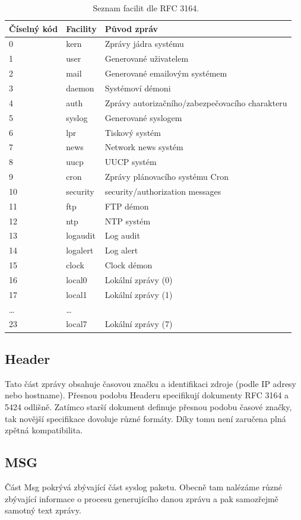 \documentclass[thesis=B,czech]{FITthesis}[2012/06/26]
\begin{document}
\begin{table}[ht]   %
\centering
	\caption[Tabulka facilit podle RFC 3164]{Seznam facilit dle RFC 3164.~\cite{RFC3164}}
	\begin{tabular}{|l|l|l|}\hline
		Číselný kód & Facility & Původ zpráv \tabularnewline \hline \hline
		0		& kern & Zprávy jádra systému	\tabularnewline \hline
		1		& user & Generované uživatelem	\tabularnewline \hline
		2		& mail & Generované emailovým systémem			\tabularnewline \hline
		3		& daemon & Systémoví démoni			\tabularnewline \hline
		4		& auth & Zprávy autorizačního/zabezpečovacího charakteru		\tabularnewline \hline
		5		& syslog & Generované syslogem	\tabularnewline \hline
		6		& lpr & Tiskový systém		\tabularnewline \hline
		7		& news & Network news systém		\tabularnewline \hline
		8		& uucp & UUCP systém			\tabularnewline \hline
		9		& cron & Zprávy plánovacího systému Cron			\tabularnewline \hline
		10		& security & security/authorization messages			\tabularnewline \hline
		11		& ftp & FTP démon				\tabularnewline \hline
		12		& ntp & NTP systém			\tabularnewline \hline
		13		& logaudit & Log audit				\tabularnewline \hline
		14		& logalert & Log alert				\tabularnewline \hline
		15		& clock & Clock démon			\tabularnewline \hline
		16		& local0 & Lokální zprávy (0)			\tabularnewline \hline
		17		& local1 & Lokální zprávy (1)			\tabularnewline \hline
		\ldots	& \ldots				\tabularnewline \hline
		23		& local7 & Lokální zprávy (7)			\tabularnewline \hline
	\end{tabular}
\end{table}

\subsection{Header}
Tato část zprávy obsahuje časovou značku a identifikaci zdroje (podle IP adresy nebo hostname). Přesnou podobu Headeru specifikují dokumenty RFC 3164 a 5424 odlišně. Zatímco starší dokument definuje přesnou podobu časové značky, tak novější specifikace dovoluje různé formáty. Díky tomu není zaručena plná zpětná kompatibilita.

\subsection{MSG}
Část Msg pokrývá zbývající část syslog paketu. Obecně tam nalézáme různé zbývající informace o procesu generujícího danou zprávu a pak samozřejmě samotný text zprávy.
\end{document}
